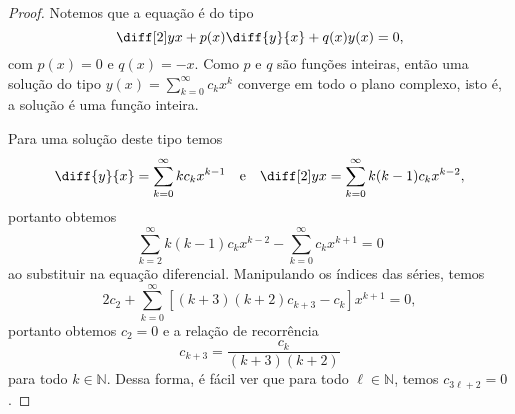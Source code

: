 \begin{proof}
    Notemos que a equação é do tipo
    \begin{equation*}
        \diff[2]yx + p(x) \diff{y}{x} + q(x)y(x) = 0,
    \end{equation*}
    com \(p(x) = 0\) e \(q(x) = -x\). Como \(p\) e \(q\) são funções inteiras, então uma solução do tipo \(y(x) = \sum_{k = 0}^\infty c_k x^k\) converge em todo o plano complexo, isto é, a solução é uma função inteira.

    Para uma solução deste tipo temos
    \begin{equation*}
        \diff{y}{x} = \sum_{k = 0}^\infty kc_kx^{k-1}\quad\text{e}\quad\diff[2]yx = \sum_{k = 0}^\infty k(k-1)c_kx^{k-2},
    \end{equation*}
    portanto obtemos
    \begin{equation*}
        \sum_{k = 2}^{\infty} k(k-1)c_kx^{k-2} - \sum_{k = 0}^\infty c_kx^{k+1} = 0
    \end{equation*}
    ao substituir na equação diferencial. Manipulando os índices das séries, temos
    \begin{equation*}
        2c_2 + \sum_{k = 0}^\infty\left[(k+3)(k+2)c_{k+3} - c_k\right]x^{k+1} = 0,
    \end{equation*}
    portanto obtemos \(c_2 = 0\) e a relação de recorrência
    \begin{equation*}
        c_{k+3} = \frac{c_k}{(k+3)(k+2)}
    \end{equation*}
    para todo \(k \in \mathbb{N}\). Dessa forma, é fácil ver que para todo \(\ell \in \mathbb{N}\), temos \(c_{3\ell+2} = 0\).


\end{proof}
